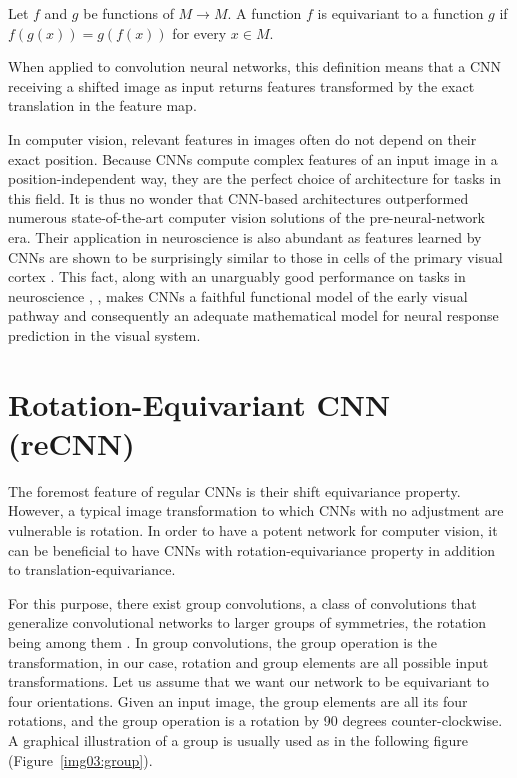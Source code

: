 \begin{defn}[Equivariance]\label{def01:8}
	Let $f$ and $g$ be functions of $M \to M$. A function $f$ is equivariant to a function $g$ if $f(g(x)) = g(f(x))$ for every $x \in M$.
\end{defn}

When applied to convolution neural networks, this definition means that a CNN receiving a shifted image as input returns features transformed by the exact translation in the feature map.

In computer vision, relevant features in images often do not depend on their exact position. Because CNNs compute complex features of an input image in a position-independent way, they are the perfect choice of architecture for tasks in this field. It is thus no wonder that CNN-based architectures outperformed numerous state-of-the-art computer vision solutions of the pre-neural-network era. Their application in neuroscience is also abundant as features learned by CNNs are shown to be surprisingly similar to those in cells of the primary visual cortex \citep{kriegeskorte2015deep}. This fact, along with an unarguably good performance on tasks in neuroscience \citep{cadena2019deep}, \citep{klindt2017neural}, makes CNNs a faithful functional model of the early visual pathway and consequently an adequate mathematical model for neural response prediction in the visual system.

\section{Rotation-Equivariant CNN (reCNN)}


The foremost feature of regular CNNs is their shift equivariance property. However, a typical image transformation to which CNNs with no adjustment are vulnerable is rotation. In order to have a potent network for computer vision, it can be beneficial to have CNNs with rotation-equivariance property in addition to translation-equivariance.

For this purpose, there exist group convolutions, a class of convolutions that generalize convolutional networks to larger groups of symmetries, the rotation being among them \citep{cohen2016group}. In group convolutions, the group operation is the transformation, in our case, rotation and group elements are all possible input transformations. Let us assume that we want our network to be equivariant to four orientations. Given an input image, the group elements are all its four rotations, and the group operation is a rotation by 90 degrees counter-clockwise. A graphical illustration of a group is usually used as in the following figure (Figure~\ref{img03:group}).


